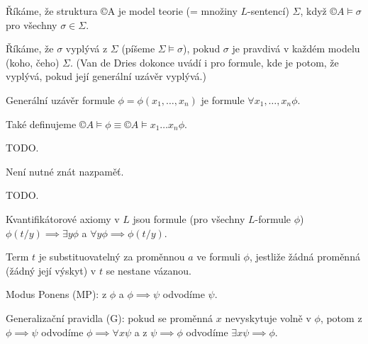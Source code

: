 \documentclass[12pt]{article}                   %
\begin{document}
        \begin{definice}
            Říkáme, že struktura ©A je model teorie (= množiny $L$-sentencí) $\Sigma$, když $©A \models \sigma$ pro všechny $\sigma \in \Sigma$.
        \end{definice}

        \begin{definice}
            Říkáme, že $\sigma$ vyplývá z $\Sigma$ (píšeme $\Sigma \models \sigma$), pokud $\sigma$ je pravdivá v každém modelu (koho, čeho) $\Sigma$. (Van de Dries dokonce uvádí i pro formule, kde je potom, že vyplývá, pokud její generální uzávěr vyplývá.)
        \end{definice}

        \begin{definice}
            Generální uzávěr formule $\phi = \phi(x_1, …, x_n)$ je formule $\forall x_1, …, x_n \phi$.

            Také definujeme $©A \models \phi ≡ ©A \models x_1…x_n\phi$.
        \end{definice}

        \begin{definice}
            TODO.
            
            Není nutné znát nazpaměť.
        \end{definice}

        \begin{definice}
            TODO.
        \end{definice}

        \begin{definice}
            Kvantifikátorové axiomy v $L$ jsou formule (pro všechny $L$-formule $\phi$) $\phi(t/y) \implies \exists y\phi$ a $\forall y \phi \implies \phi(t/y)$.
        \end{definice}

        \begin{definice}
            Term $t$ je substituovatelný za proměnnou $a$ ve formuli $\phi$, jestliže žádná proměnná (žádný její výskyt) v $t$ se nestane vázanou.
        \end{definice}

        \begin{definice}
            Modus Ponens (MP): z $\phi$ a $\phi \implies \psi$ odvodíme $\psi$.

            Generalizační pravidla (G): pokud se proměnná $x$ nevyskytuje volně v $\phi$, potom z $\phi \implies \psi$ odvodíme $\phi \implies \forall x\psi$ a z $\psi \implies \phi$ odvodíme $\exists x \psi \implies \phi$.
        \end{definice}
\end{document}
